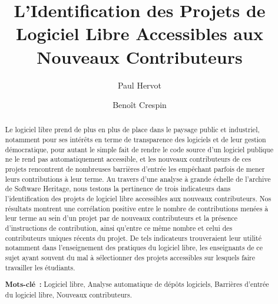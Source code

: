 \documentclass[dvipsnames]{llncs}
\title{L'Identification des Projets de Logiciel Libre Accessibles aux Nouveaux Contributeurs}
\author{%
    Paul Hervot\inst{1}%
    \and%
    Benoît Crespin\inst{2}\orcidID{0000-0002-9105-0243}%
}
\institute{EPITA}
\institute{EPITA \and Université de Limoge}
\begin{document}
    \maketitle

    \begin{abstract}
        Le logiciel libre prend de plus en plus de place dans le paysage public et industriel, notamment pour
        ses intérêts en terme de transparence des logiciels et de leur gestion démocratique, pour autant le
        simple fait de rendre le code source d'un logiciel publique ne le rend pas automatiquement accessible,
        et les nouveaux contributeurs de ces projets rencontrent de nombreuses barrières d'entrée les
        empêchant parfois de mener leurs contributions à leur terme. Au travers d'une analyse à grande échelle
        de l'archive de Software Heritage, nous testons la pertinence de trois indicateurs dans
        l'identification des projets de logiciel libre accessibles aux nouveaux contributeurs. Nos résultats
        montrent une corrélation positive entre le nombre de contributions menées à leur terme au sein d'un
        projet par de nouveaux contributeurs et la présence d'instructions de contribution, ainsi qu'entre ce
        même nombre et celui des contributeurs uniques récents du projet. De tels indicateurs trouveraient
        leur utilité notamment dans l'enseignement des pratiques du logiciel libre, les enseignants de ce
        sujet ayant souvent du mal à sélectionner des projets accessibles sur lesquels faire travailler les
        étudiants.

        \textbf{Mots-clé :} Logiciel libre, Analyse automatique de dépôts logiciels, Barrières d'entrée du
        logiciel libre, Nouveaux contributeurs.
    \end{abstract}
\end{document}
